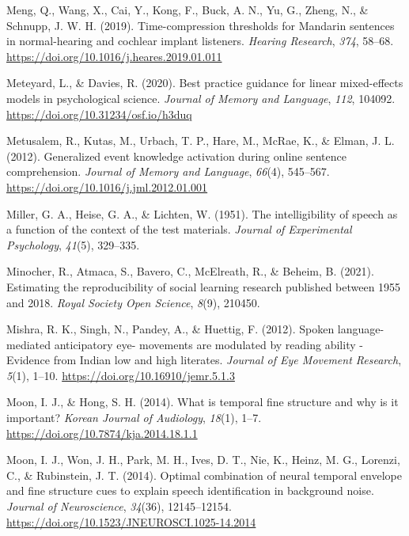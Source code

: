\documentclass[a4paper, nobind]{templates/ociamthesis}
\newlength{\cslhangindent}
\newenvironment{CSLReferences}[2] %
 {%
  \setlength{\parindent}{0pt}
  \ifodd #1
  \let\oldpar\par
  \def\par{\hangindent=\cslhangindent\oldpar}
  \fi
  \setlength{\parskip}{1mm}
  \setlength{\baselineskip}{6mm}
 }%
 {}
\begin{document}
\begin{CSLReferences}{1}{0}
\leavevmode{}%
Meng, Q., Wang, X., Cai, Y., Kong, F., Buck, A. N., Yu, G., Zheng, N., \& Schnupp, J. W. H. (2019). {Time-compression thresholds for Mandarin sentences in normal-hearing and cochlear implant listeners}. \emph{Hearing Research}, \emph{374}, 58--68. \url{https://doi.org/10.1016/j.heares.2019.01.011}

\leavevmode{}%
Meteyard, L., \& Davies, R. (2020). {Best practice guidance for linear mixed-effects models in psychological science}. \emph{Journal of Memory and Language}, \emph{112}, 104092. \url{https://doi.org/10.31234/osf.io/h3duq}

\leavevmode{}%
Metusalem, R., Kutas, M., Urbach, T. P., Hare, M., McRae, K., \& Elman, J. L. (2012). Generalized event knowledge activation during online sentence comprehension. \emph{Journal of Memory and Language}, \emph{66}(4), 545--567. \url{https://doi.org/10.1016/j.jml.2012.01.001}

\leavevmode{}%
Miller, G. A., Heise, G. A., \& Lichten, W. (1951). {The intelligibility of speech as a function of the context of the test materials}. \emph{Journal of Experimental Psychology}, \emph{41}(5), 329--335.

\leavevmode{}%
Minocher, R., Atmaca, S., Bavero, C., McElreath, R., \& Beheim, B. (2021). Estimating the reproducibility of social learning research published between 1955 and 2018. \emph{Royal Society Open Science}, \emph{8}(9), 210450.

\leavevmode{}%
Mishra, R. K., Singh, N., Pandey, A., \& Huettig, F. (2012). {Spoken language-mediated anticipatory eye- movements are modulated by reading ability - Evidence from Indian low and high literates}. \emph{Journal of Eye Movement Research}, \emph{5}(1), 1--10. \url{https://doi.org/10.16910/jemr.5.1.3}

\leavevmode{}%
Moon, I. J., \& Hong, S. H. (2014). What is temporal fine structure and why is it important? \emph{Korean Journal of Audiology}, \emph{18}(1), 1--7. \url{https://doi.org/10.7874/kja.2014.18.1.1}

\leavevmode{}%
Moon, I. J., Won, J. H., Park, M. H., Ives, D. T., Nie, K., Heinz, M. G., Lorenzi, C., \& Rubinstein, J. T. (2014). Optimal combination of neural temporal envelope and fine structure cues to explain speech identification in background noise. \emph{Journal of Neuroscience}, \emph{34}(36), 12145--12154. \url{https://doi.org/10.1523/JNEUROSCI.1025-14.2014}


\end{CSLReferences}
\end{document}
